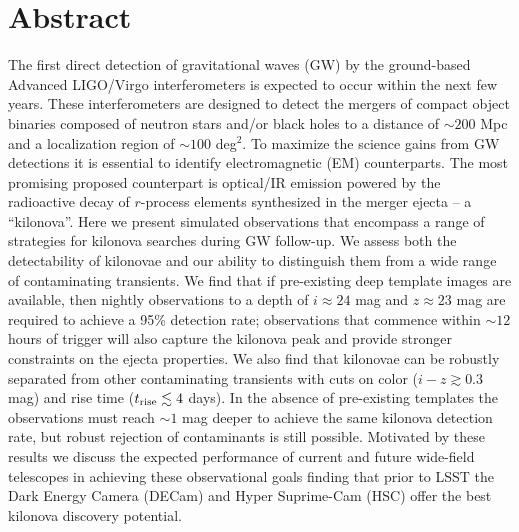 \clearpage
\section*{Abstract}
The first direct detection of gravitational waves (GW) by the ground-based Advanced LIGO/Virgo interferometers is expected to occur within the next few years. These interferometers are designed to detect the mergers of compact object binaries composed of neutron stars and/or black holes to a distance of $\sim 200$ Mpc and a localization region of $\sim 100$ deg$^2$.  To maximize the science gains from GW detections it is essential to identify electromagnetic (EM) counterparts. The most promising proposed counterpart is optical/IR emission powered by the radioactive decay of $r$-process elements synthesized in the merger ejecta -- a ``kilonova''.  Here we present simulated observations that encompass a range of strategies for kilonova searches during GW follow-up.  We assess both the detectability of kilonovae and our ability to distinguish them from a wide range of contaminating transients. We find that if pre-existing deep template images are available, then nightly observations to a depth of $i\approx 24$ mag and $z\approx 23$ mag are required to achieve a 95\% detection rate; observations that commence within $\sim 12$ hours of trigger will also capture the kilonova peak and provide stronger constraints on the ejecta properties.  We also find that kilonovae can be robustly separated from other contaminating transients with cuts on color ($i-z\gtrsim 0.3$ mag) and rise time ($t_{{\rm rise}}\lesssim 4$ days).  In the absence of pre-existing templates the observations must reach $\sim 1$ mag deeper to achieve the same kilonova detection rate, but robust rejection of contaminants is still possible.  Motivated by these results we discuss the expected performance of current and future wide-field telescopes in achieving these observational goals finding that prior to LSST the Dark Energy Camera (DECam) and Hyper Suprime-Cam (HSC) offer the best kilonova discovery potential.

